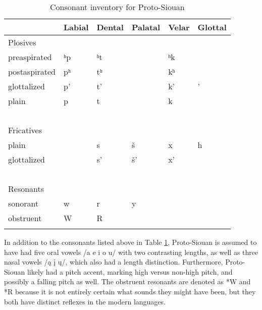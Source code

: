 \documentclass[output=paper]{LSP/langsci}
\begin{document}
{\begin{table}[h!]
\caption{Consonant inventory for Proto-Siouan} \label{psiinventory}
    \begin{tabular}{llllll} \lsptoprule
    ~                   & Labial    & Dental     & Palatal & Velar    & Glottal \\
   \midrule
  Plosives   & ~                   & ~                   & ~                & ~                   & ~                \\
    preaspirated        & ʰp & ʰt & ~                & ʰk & ~                \\
    postaspirated       & pʰ & tʰ & ~                & kʰ & ~                \\
    glottalized         & p'                  & t'                  & ~                & k'                  & '                \\
    plain               & p                   & t                   & ~                & k                   & ~                \\
    ~                   & ~                   & ~                   & ~                & ~                   & ~                \\
  Fricatives & ~                   & ~                   & ~                & ~                   & ~                \\
    plain               & ~                   & s                   & \v{s}            & x                   & h                \\
    glottalized         & ~                   & s'                  & \v{s}'           & x'                  & ~                \\
    ~                   & ~                   & ~                   & ~                & ~                   & ~                \\
Resonants  & ~                   & ~                   & ~                & ~                   & ~                \\
    sonorant            & w                   & r                   & y                & ~                   & ~                \\
    obstruent           & W                   & R                   & ~                & ~                   & ~                \\ \lspbottomrule
    \end{tabular}
\end{table}

In addition to the consonants listed above in Table \ref{psiinventory}, Proto-Siouan is assumed to have had five oral vowels /a e i o u/ with two contrasting lengths, as well as three nasal vowels /\k{a} \k{i} \k{u}/, which also had a length distinction. Furthermore, Proto-Siouan likely had a pitch accent, marking high versus non-high pitch, and possibly a falling pitch as well. The obstruent resonants are denoted as *W and *R because it is not entirely certain what sounds they might have been, but they both have distinct reflexes in the modern languages.

}
\end{document}

